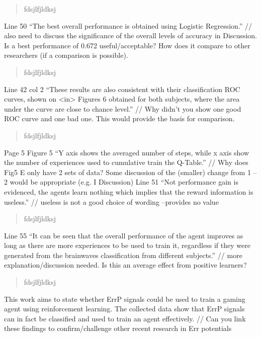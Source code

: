 \documentclass[journal,onecolumn,12pt]{IEEEtran}
\begin{document}
\begin{quotation}
{\color{blue}
fdsjlfjldksj
}
\end{quotation}

Line 50 “The best overall performance is obtained using Logistic Regression.” // also need to discuss the significance of the overall levels of accuracy in Discussion. Is a best performance of 0.672 useful/acceptable? How does it compare to other researchers (if a comparison is possible).

\begin{quotation}
{\color{blue}
fdsjlfjldksj
}
\end{quotation}

Line 42 col 2 “These results are also consistent with their classification ROC curves, shown on <in> Figures 6 obtained for both subjects, where the area under the curve are close to chance level.” // Why didn’t you show one good ROC curve and one bad one. This would provide the basis for comparison.

\begin{quotation}
{\color{blue}
fdsjlfjldksj
}
\end{quotation}

Page 5
Figure 5 “Y axis shows the averaged number of steps, while x axis show the number of
experiences used to cumulative train the Q-Table.”
// Why does Fig5 E only have 2 sets of data? Some discussion of the (smaller) change from 1 – 2 would be appropriate (e.g. I Discussion)
Line 51 “Not performance gain is evidenced, the agents learn nothing which implies that the reward information is useless.” // useless is not a good choice of wording –provides no value

\begin{quotation}
{\color{blue}
fdsjlfjldksj
}
\end{quotation}

Line 55 “It can be seen that the overall performance of the agent improves as long as there are more experiences to be used to train it, regardless if they were generated from the brainwaves classification from different subjects.” // more explanation/discussion needed. Is this an average effect from positive learners?

\begin{quotation}
{\color{blue}
fdsjlfjldksj
}
\end{quotation}

This work aims to state whether ErrP signals could be used to train a gaming agent using reinforcement learning. The collected data show that ErrP signals can in fact be classified and used to train an agent effectively. // Can you link these findings to confirm/challenge other recent research in Err potentials
\end{document}
